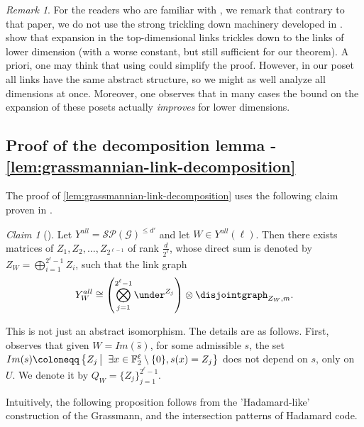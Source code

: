 \documentclass[10pt,a4paper]{article}
\newcommand{\prettyref}[1]{\cref{#1}}
\theoremstyle{definition}
\theoremstyle{remark}
\newtheorem{claim}[theorem]{Claim}
\newtheorem{remark}[theorem]{Remark}
\newcommand\sett[2]{\left\{ #1 \left| \; \vphantom{#1 #2} \right. #2  \right\}}
\newcommand{\set}[1]{\{#1\}}
\newcommand{\F}{\mathbb{F}}
\renewcommand{\leq}{\leqslant}
\numberwithin{equation}{section}
\let\pref=\prettyref
\def\Gr{\mathcal{G}}
\def\diml{d}
\def\dimlin{{\diml}}
\def\dimlout{\diml'}
\def\dimm{\ell}
\def\M{\mathcal{SP}}
\def\Mgras{Y^{all}}
\def\MP{\mathcal{M}}
\begin{document}
\begin{remark}
    For the readers who are familiar with \cite{Golowich2023}, we remark that contrary to that paper, we do not use the strong trickling down machinery developed in \cite{kaufmanT2021garland}. \cite{kaufmanT2021garland} show that expansion in the top-dimensional links trickles down to the links of lower dimension (with a worse constant, but still sufficient for our theorem). A priori, one may think that using \cite{kaufmanT2021garland} could simplify the proof. However, in our poset all links have the same abstract structure, so we might as well analyze all dimensions at once. Moreover, one observes that in many cases the bound on the expansion of these posets actually \emph{improves} for lower dimensions.
\end{remark}

\subsection{Proof of the decomposition lemma - \pref{lem:grassmannian-link-decomposition}} \label{sec:proof-of-decomp-lemma}
The proof of \pref{lem:grassmannian-link-decomposition} uses the following claim proven in \cite{Golowich2023}. %

\begin{claim}[{\cite[Proposition 55]{Golowich2023}}] 
    Let \(\Mgras = \M(\Gr)^{\leq \dimlout}\) and let \(W \in \Mgras(\dimm)\). Then there exists matrices of \(Z_1,Z_2,\dots,Z_{2^{\dimm-1}}\) of rank \(\frac{\dimlin}{2^\dimm}\), whose direct sum is denoted by \(Z_W = \bigoplus_{i=1}^{2^\dimm - 1}Z_i\), such that the link graph 
    \[\Mgras_W \cong  \left ( \bigotimes_{j=1}^{2^\dimm -1} \under^{Z_j} \right ) \otimes \disjointgraph_{Z_W,m}.\]
\end{claim}
This is not just an abstract isomorphism. The details are as follows. First, \cite{Golowich2023} observes that given \(W = Im(\widehat{s})\), for some admissible \(s\), the set \(Im(s) \coloneqq \sett{Z_j}{\exists x \in \F_2^\dimm \setminus \set{0}, s(x)=Z_j}\) does not depend on \(s\), only on \(U\). We denote it by \(Q_W = \set{Z_j}_{j=1}^{2^\dimm-1}\).
%

Intuitively, the following proposition follows from the 'Hadamard-like' construction of the Grassmann, and the intersection patterns of Hadamard code.
\end{document}
